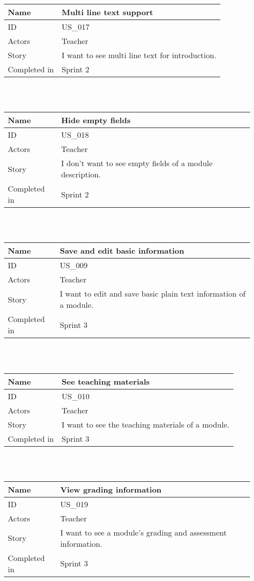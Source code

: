 \documentclass[12pt, a4paper]{article}
\newcommand\addrow[2]{#1 &#2\\ }
\newcommand\tabularhead{\begin{tabular}{lp{8cm}}
		\hline
	}
\newenvironment{usecase}{\tabularhead}
	{\hline\end{tabular}}
\begin{document}
 \begin{usecase}
 	\addrow{Name}{Multi line text support}
 	\hline
 	\addrow{ID}{US\_017}
 	\hline
 	\addrow{Actors}{ Teacher }
 	\hline		
 	\addrow{Story}{I want to see multi line text for introduction.}
 	\hline
 	\addrow{Completed in}{Sprint 2}
 \end{usecase}
 
 ~\\
 ~\\
 
 \begin{usecase}
 	\addrow{Name}{Hide empty fields}
 	\hline
 	\addrow{ID}{US\_018}
 	\hline
 	\addrow{Actors}{ Teacher }
 	\hline		
 	\addrow{Story}{I don't want to see empty fields of a module description.}
 	\hline
 	\addrow{Completed in}{Sprint 2}
 \end{usecase}

~\\
~\\
	
		    \begin{usecase}
		\addrow{Name}{Save and edit basic information}
		\hline
		\addrow{ID}{US\_009}
		\hline
		\addrow{Actors}{ Teacher }
		\hline		
		\addrow{Story}{I want to edit and save basic plain text information of a module.}
		\hline
		\addrow{Completed in}{Sprint 3}
	\end{usecase}
	
	~\\
	~\\
	
	\begin{usecase}
		\addrow{Name}{See teaching materials}
		\hline
		\addrow{ID}{US\_010}
		\hline
		\addrow{Actors}{ Teacher}
		\hline		
		\addrow{Story}{I want to see the teaching materials of a module.}
		\hline
		\addrow{Completed in}{Sprint 3}
	\end{usecase}
	
	~\\
	~\\
	
	\begin{usecase}
		\addrow{Name}{View grading information}
		\hline
		\addrow{ID}{US\_019}
		\hline
		\addrow{Actors}{ Teacher }
		\hline		
		\addrow{Story}{I want to see a module's grading and assessment information.}
		\hline
		\addrow{Completed in}{Sprint 3}
	\end{usecase}

~\\
~\\
	
\end{document}
